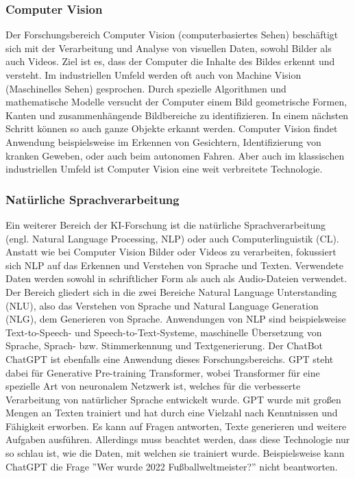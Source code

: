 \documentclass[a4paper,12pt, german]{report}
\begin{document}
\subsubsection{Computer Vision} 

Der Forschungsbereich Computer Vision (computerbasiertes Sehen) beschäftigt sich mit der Verarbeitung und Analyse von visuellen Daten, sowohl Bilder als auch Videos. Ziel ist es, dass der Computer die Inhalte des Bildes erkennt und versteht. Im industriellen Umfeld werden oft auch von Machine Vision (Maschinelles Sehen) gesprochen. 
Durch spezielle Algorithmen und mathematische Modelle versucht der Computer einem Bild geometrische Formen, Kanten und zusammenhängende Bildbereiche zu identifizieren. In einem nächsten Schritt können so auch ganze Objekte erkannt werden. 
Computer Vision findet Anwendung beispielsweise im Erkennen von Gesichtern, Identifizierung von kranken Geweben, oder auch beim autonomen Fahren. Aber auch im klassischen industriellen Umfeld ist Computer Vision eine weit verbreitete Technologie.


\subsubsection{Natürliche Sprachverarbeitung}  
 
Ein weiterer Bereich der KI-Forschung ist die natürliche Sprachverarbeitung (engl. Natural Language Processing, NLP) oder auch Computerlinguistik (CL). Anstatt wie bei Computer Vision Bilder oder Videos zu verarbeiten, fokussiert sich NLP auf das Erkennen und Verstehen von Sprache und Texten. Verwendete Daten werden sowohl in schriftlicher Form als auch als Audio-Dateien verwendet. Der Bereich gliedert sich in die zwei Bereiche Natural Language Unterstanding (NLU), also das Verstehen von Sprache und Natural Language Generation (NLG), dem Generieren von Sprache. \newline
Anwendungen von NLP sind beispielsweise Text-to-Speech- und Speech-to-Text-Systeme, maschinelle Übersetzung von Sprache, Sprach- bzw. Stimmerkennung und Textgenerierung. 
Der ChatBot ChatGPT ist ebenfalls eine Anwendung dieses Forschungsbereichs. GPT steht dabei für Generative Pre-training Transformer, wobei Transformer für eine spezielle Art von neuronalem Netzwerk ist, welches für die verbesserte Verarbeitung von natürlicher Sprache entwickelt wurde. GPT wurde mit großen Mengen an Texten trainiert und hat durch eine Vielzahl nach Kenntnissen und Fähigkeit erworben. Es kann auf Fragen antworten, Texte generieren und weitere Aufgaben ausführen.\cite{04} 
Allerdings muss beachtet werden, dass diese Technologie nur so schlau ist, wie die Daten, mit welchen sie trainiert wurde. Beispielsweise kann ChatGPT die Frage ''Wer wurde 2022 Fußballweltmeister?'' nicht beantworten. 
\end{document}
